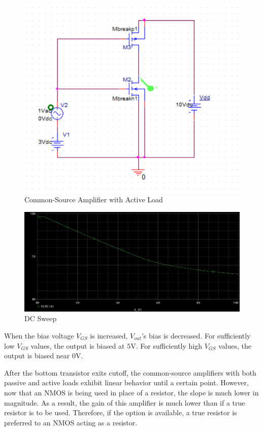 \FloatBarrier

\begin{figure}[h!]
	\centering
	\includegraphics[scale=0.75]{../images/circuit4.PNG}
	\caption{Common-Source Amplifier with Active Load}
	\label{fig:circuit4}
\end{figure}

\FloatBarrier

\FloatBarrier

\begin{figure}[h!]
	\centering
	\includegraphics[scale=0.75]{../images/dc_sweep.PNG}
	\caption{DC Sweep}
	\label{fig:dc_sweep}
\end{figure}

\FloatBarrier

When the bias voltage $V_{GS}$ is increased, $V_{out}$'s bias is decreased. For sufficiently low $V_{GS}$ values, the output is biased at $5$\si{\volt}. For sufficiently high $V_{GS}$ values, the output is biased near $0$\si{\volt}.

After the bottom transistor exits cutoff, the common-source amplifiers with both passive and active loads exhibit linear behavior until a certain point. However, now that an NMOS is being used in place of a resistor, the slope is much lower in magnitude. As a result, the gain of this amplifier is much lower than if a true resistor is to be used. Therefore, if the option is available, a true resistor is preferred to an NMOS acting as a resistor.
